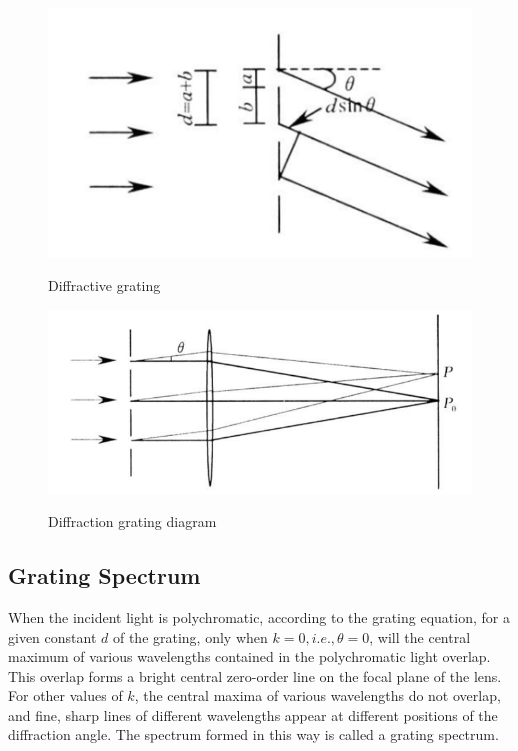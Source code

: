 \documentclass[UTF8]{article}
\begin{document}
      	 \begin{figure}[H]
            \begin{minipage}[t]{0.4\linewidth}
               \centering
               \includegraphics[clip,scale=0.7,trim={0 0 0 0}]{fig/fig2.png}
               \label{figure.11}
              \caption{Diffractive grating}
            \end{minipage}
            \begin{minipage}[t]{0.7\linewidth}
               \centering
               \includegraphics[clip,scale=0.7,trim={0 0 0 0}]{fig/fig3.png}
               \label{figure.12}
               \caption{Diffraction grating diagram}
            \end{minipage}  
	  
         \end{figure} 
    
   
   
   \subsection{Grating Spectrum}
   
   When the incident light is polychromatic, according to the grating equation, for a given constant $d$ of the grating, only when $k = 0, i.e., \theta = 0$, will the central maximum of various wavelengths contained in the polychromatic light overlap. This overlap forms a bright central zero-order line on the focal plane of the lens. For other values of $k$, the central maxima of various wavelengths do not overlap, and fine, sharp lines of different wavelengths appear at different positions of the diffraction angle. The spectrum formed in this way is called a grating spectrum.
   
\end{document}
